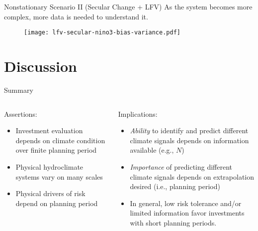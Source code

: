 \documentclass[
  10pt,     %
]{beamer}
\makeatletter
\newcommand*{\eg}{e.g.\@\xspace}
\newcommand*{\ie}{i.e.\@\xspace}
\makeatother
\begin{document}
\begin{frame}{Nonstationary Scenario II (Secular Change + LFV)}
  As the system becomes more complex, more data is needed to understand it.
  \begin{figure}
    \centering
    \texttt{[image: lfv-secular-nino3-bias-variance.pdf]}
  \end{figure}
\end{frame}

\section{Discussion}

\begin{frame}{Summary}
  \begin{columns}[T]
    \begin{column}{0.5\textwidth}
      Assertions:
      \begin{itemize}
        \item Investment evaluation depends on climate condition over finite planning period
        \item Physical hydroclimate systems vary on many scales
        \item Physical drivers of risk depend on planning period
      \end{itemize}    
    \end{column}
    \pause
    \begin{column}{0.5\textwidth}
      Implications:
      \begin{itemize}
        \pause
        \item \emph{Ability} to identify and predict different climate signals depends on information available (\eg, $N$)
        \pause
        \item \emph{Importance} of predicting different climate signals depends on extrapolation desired (\ie, planning period)
        \pause
        \item In general, low risk tolerance and/or limited information favor investments with short planning periods.
      \end{itemize}
    \end{column}
  \end{columns}
\end{frame}

\end{document}

